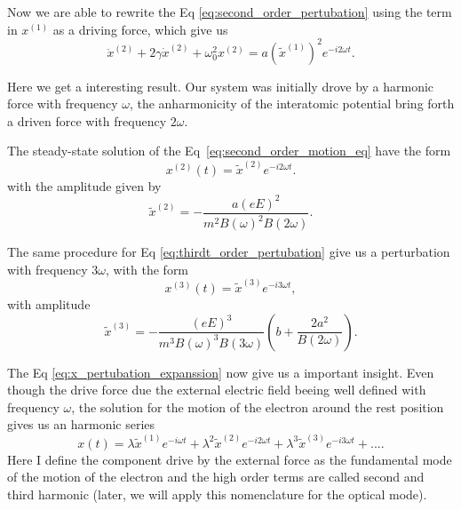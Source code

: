 Now we are able to rewrite the Eq \ref{eq:second_order_pertubation} using the term in $x^{(1)}$ as a driving force, which give us
\begin{equation}
    \ddot{x}^{(2)} + 2\gamma\dot{x}^{(2)} + \omega_0^2x^{(2)} = a\left(\tilde{x}^{(1)}\right)^2e^{-i2\omega t}.
    \label{eq:second_order_motion_eq}
\end{equation}

Here we get a interesting result. Our system was initially drove by a harmonic force with frequency $\omega$, the anharmonicity of the interatomic potential bring forth a driven force with frequency $2\omega$. 

The steady-state solution of the Eq~\ref{eq:second_order_motion_eq} have the form
\begin{equation}
    x^{(2)}(t) = \tilde{x}^{(2)}e^{-i2\omega t}.
\end{equation}
with the amplitude given by
\begin{equation}
    \tilde{x}^{(2)} = -\frac{a\left(eE\right)^2}{m^2B(\omega)^2B(2\omega)}.
\end{equation}

The same procedure for Eq \ref{eq:thirdt_order_pertubation} give us a perturbation with frequency $3\omega$, with the form 
\begin{equation}
    x^{(3)}(t) = \tilde{x}^{(3)}e^{-i3\omega t},
\end{equation}
with amplitude
\begin{equation}
    \tilde{x}^{(3)} = -\frac{\left(eE\right)^3}{m^3B(\omega)^3B(3\omega)}\left(b+\frac{2a ^2}{B(2\omega)}\right).
\end{equation}

The Eq \ref{eq:x_pertubation_expanssion} now give us a important insight. Even though the drive force due the external electric field beeing well defined with frequency $\omega$, the solution for the motion of the electron around the rest position gives us an harmonic series
\begin{equation}
    x(t) = \lambda \tilde{x}^{(1)}e^{-i\omega t} + \lambda^2 \tilde{x}^{(2)}e^{-i2\omega t} + \lambda^3 \tilde{x}^{(3)}e^{-i3\omega t} +....
\end{equation}
Here I define the component drive by the external force as the fundamental mode of the motion of the electron and the high order terms are called second and third harmonic (later, we will apply this nomenclature for the optical mode).%

